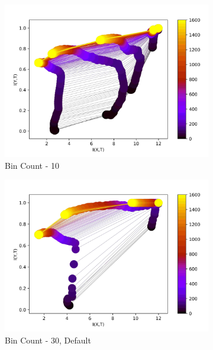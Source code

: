 \documentclass[dissertation.tex]{subfiles}
\begin{document}
\begin{figure}[ht]
  \centering
  \begin{subfigure}[t]{0.24\textwidth}
    \centering
    \includegraphics[width=\textwidth]{figs/eval/binCount/Binning10.jpg}
    \caption{
      Bin Count - 10
    }
    \label{figBinCount10}
  \end{subfigure}
  \hfill
  \begin{subfigure}[t]{0.24\textwidth}
    \centering
    \includegraphics[width=\textwidth]{figs/eval/binCount/Binning30.jpg}
    \caption{
      Bin Count - 30, Default
    }
    \label{figBinCount30}
  \end{subfigure}
  \hfill
  \begin{subfigure}[t]{0.24\textwidth}

\end{subfigure}
\end{figure}
\end{document}
